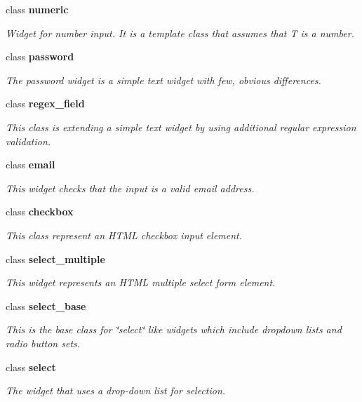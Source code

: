 \begin{DoxyCompactItemize}
class {\bf numeric}
\begin{DoxyCompactList}\small\item\em Widget for number input. It is a template class that assumes that T is a number. \end{DoxyCompactList}\item 
class {\bf password}
\begin{DoxyCompactList}\small\item\em The password widget is a simple text widget with few, obvious differences. \end{DoxyCompactList}\item 
class {\bf regex\-\_\-field}
\begin{DoxyCompactList}\small\item\em This class is extending a simple text widget by using additional regular expression validation. \end{DoxyCompactList}\item 
class {\bf email}
\begin{DoxyCompactList}\small\item\em This widget checks that the input is a valid email address. \end{DoxyCompactList}\item 
class {\bf checkbox}
\begin{DoxyCompactList}\small\item\em This class represent an H\-T\-M\-L checkbox input element. \end{DoxyCompactList}\item 
class {\bf select\-\_\-multiple}
\begin{DoxyCompactList}\small\item\em This widget represents an H\-T\-M\-L multiple select form element. \end{DoxyCompactList}\item 
class {\bf select\-\_\-base}
\begin{DoxyCompactList}\small\item\em This is the base class for \char`\"{}select\char`\"{} like widgets which include dropdown lists and radio button sets. \end{DoxyCompactList}\item 
class {\bf select}
\begin{DoxyCompactList}\small\item\em The widget that uses a drop-\/down list for selection. \end{DoxyCompactList}\item 

\end{DoxyCompactItemize}
